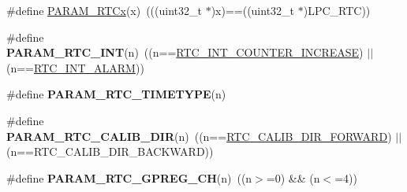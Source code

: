 \begin{DoxyCompactItemize}
\item 
\#define \hyperlink{group___r_t_c___private___macros_ga2da5e28a5e4ec4b0394bef154b276719}{\-P\-A\-R\-A\-M\-\_\-\-R\-T\-Cx}(x)~(((uint32\-\_\-t $\ast$)x)==((uint32\-\_\-t $\ast$)\-L\-P\-C\-\_\-\-R\-T\-C))
\item 
\hypertarget{group___r_t_c___private___macros_gaa26781dd9253a3d94fcf9611f69fd7e2}{\#define {\bfseries \-P\-A\-R\-A\-M\-\_\-\-R\-T\-C\-\_\-\-I\-N\-T}(n)~((n==\hyperlink{group___r_t_c___public___types_ggadc4fcfa14fbbb673619c9da8b56d053ca1545f38fd2671cb7521a77e7da3bde4d}{\-R\-T\-C\-\_\-\-I\-N\-T\-\_\-\-C\-O\-U\-N\-T\-E\-R\-\_\-\-I\-N\-C\-R\-E\-A\-S\-E}) $|$$|$ (n==\hyperlink{group___r_t_c___public___types_ggadc4fcfa14fbbb673619c9da8b56d053cadec1af649886bf5a419d636276ca54a5}{\-R\-T\-C\-\_\-\-I\-N\-T\-\_\-\-A\-L\-A\-R\-M}))}\label{group___r_t_c___private___macros_gaa26781dd9253a3d94fcf9611f69fd7e2}

\item 
\#define {\bfseries \-P\-A\-R\-A\-M\-\_\-\-R\-T\-C\-\_\-\-T\-I\-M\-E\-T\-Y\-P\-E}(n)
\item 
\hypertarget{group___r_t_c___private___macros_gaca9df160a2900e53d0a541740033c684}{\#define {\bfseries \-P\-A\-R\-A\-M\-\_\-\-R\-T\-C\-\_\-\-C\-A\-L\-I\-B\-\_\-\-D\-I\-R}(n)~((n==\hyperlink{group___r_t_c___private___macros_ga4f53042ce8b730a4b2c6eb40b856e4e8}{\-R\-T\-C\-\_\-\-C\-A\-L\-I\-B\-\_\-\-D\-I\-R\-\_\-\-F\-O\-R\-W\-A\-R\-D}) $|$$|$ (n==\-R\-T\-C\-\_\-\-C\-A\-L\-I\-B\-\_\-\-D\-I\-R\-\_\-\-B\-A\-C\-K\-W\-A\-R\-D))}\label{group___r_t_c___private___macros_gaca9df160a2900e53d0a541740033c684}

\item 
\hypertarget{group___r_t_c___private___macros_ga9088b1a3f1ffc296c096b08ef4a175ee}{\#define {\bfseries \-P\-A\-R\-A\-M\-\_\-\-R\-T\-C\-\_\-\-G\-P\-R\-E\-G\-\_\-\-C\-H}(n)~((n$>$=0) \&\& (n$<$=4))}\label{group___r_t_c___private___macros_ga9088b1a3f1ffc296c096b08ef4a175ee}

\end{DoxyCompactItemize}


